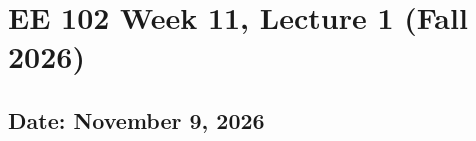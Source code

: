 \documentclass{ee102_notes}
\renewcommand{\releasedate}{November 9, 2026}
\begin{document}
\section*{EE 102 Week 11, Lecture 1 (Fall 2026)}
\subsection*{Date: \releasedate}
\tableofcontents

\end{document}
